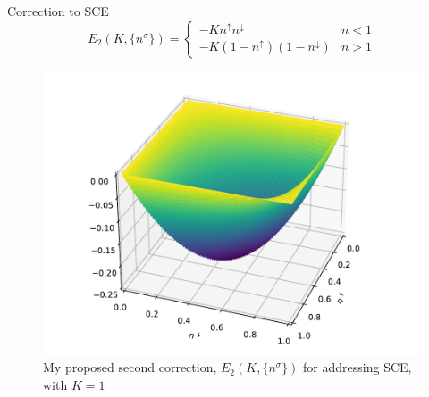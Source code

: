 \documentclass[xcolor=table,aspectratio=169]{beamer}
\numberwithin{equation}{section}
\begin{document}
\begin{frame}{Correction to SCE}
    \vspace{-1em}
    \begin{equation}
        E_2(K, \{n^\sigma\}) %
        = \begin{cases}
            - Kn^\uparrow n^\downarrow            & n < 1 \\
            - K(1 - n^\uparrow)(1 - n^\downarrow) & n > 1
        \end{cases}
        \label{eqn:novel_k_correction}
    \end{equation}
    \vspace{-1em}
    \begin{figure}[t!]
        \includegraphics[width=0.5\columnwidth]{figures/novel_k_correction.pdf}
        \caption{My proposed second correction, $E_2(K, \{n^\sigma\})$ for addressing SCE, with $K = 1$}
        \label{fig:novel_k_correction}
    \end{figure}
\end{frame}
\end{document}
